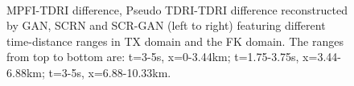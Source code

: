 \begin{figure}[!ht]
	\centering
	\\
	\caption{MPFI-TDRI difference, Pseudo TDRI-TDRI difference reconstructed by GAN, SCRN and SCR-GAN (left to right) featuring different time-distance ranges in TX domain and the FK domain. The ranges from top to bottom are: t=3-5s, x=0-3.44km; t=1.75-3.75s, x=3.44-6.88km; t=3-5s, x=6.88-10.33km.}
	\label{fig:slice_diff}
\end{figure}
%
%
%
